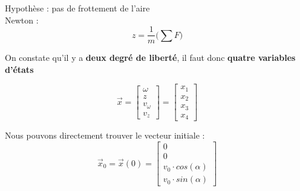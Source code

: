 \documentclass[document.tex]{subfiles}
\begin{document}
Hypothèse : pas de frottement de l'aire\\
Newton :
\begin{equation}
z = \frac{1}{m}\big(\sum F\big)
\end{equation}

On constate qu'il y a \textbf{deux degré de liberté}, il faut donc \textbf{quatre variables d'états}

\begin{equation}
 \vec{x} = \begin{bmatrix}
 	\omega \\ z \\ v_\omega \\ v_z
 \end{bmatrix} = \begin{bmatrix}
 	x_1 \\ x_2 \\ x_3 \\ x_4
 \end{bmatrix}
\end{equation}

Nous pouvons directement trouver le vecteur initiale : \\

\begin{equation}
 \vec{x}_0 = \vec{x}(0) = \begin{bmatrix}
 	0 \\ 0 \\ v_0 \cdot cos(\alpha) \\ v_0 \cdot sin(\alpha)
 \end{bmatrix}
\end{equation}
\end{document}
